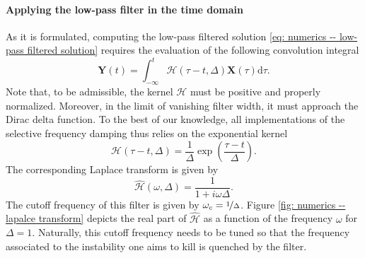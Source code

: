     \paragraph{Applying the low-pass filter in the time domain}

    As it is formulated, computing the low-pass filtered solution \eqref{eq: numerics -- low-pass filtered solution} requires the evaluation of the following convolution integral
    \begin{equation}
      \mathbf{Y}(t) = \int_{-\infty}^t \mathcal{H}(\tau-t, \Delta) \mathbf{X}(\tau) \mathrm{d}\tau.
      \label{eq: numerics -- convolution integral}
    \end{equation}
    Note that, to be admissible, the kernel $\mathcal{H}$ must be positive and properly normalized. Moreover, in the limit of vanishing filter width, it must approach the Dirac delta function. To the best of our knowledge, all implementations of the selective frequency damping thus relies on the exponential kernel
    \begin{equation}
      \mathcal{H}(\tau - t, \Delta) = \displaystyle \frac{1}{\Delta} \exp \left( \frac{\tau - t}{\Delta} \right).
      \label{eq: numerics -- exponential kernel}
    \end{equation}
    The corresponding Laplace transform is given by
    \begin{equation}
      \hat{\mathcal{H}}(\omega, \Delta) = \displaystyle \frac{1}{1 + i \omega \Delta}.
      \label{eq: numerics -- laplace transform}
    \end{equation}
    The cutoff frequency of this filter is given by $\omega_c = \nicefrac{1}{\Delta}$. Figure \ref{fig: numerics -- lapalce transform} depicts the real part of $\hat{\mathcal{H}}$ as a function of the frequency $\omega$ for $\Delta=1$. Naturally, this cutoff frequency needs to be tuned so that the frequency associated to the instability one aims to kill is quenched by the filter.

